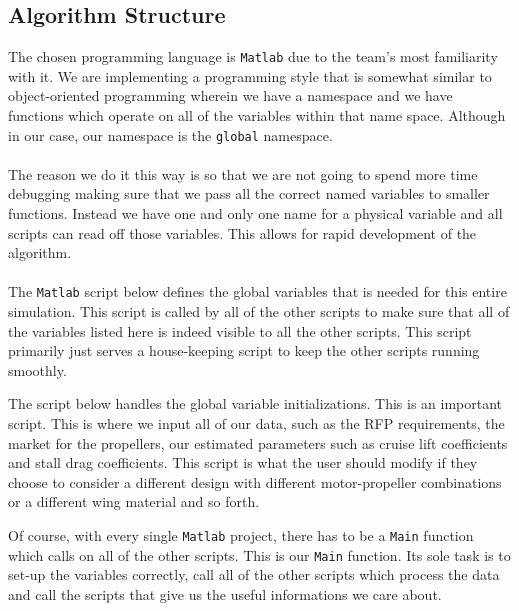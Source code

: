 \documentclass[letter, 12pt]{article}
\begin{document}
\begin{center}
\section{Algorithm Structure}
\begin{comment}
\end{comment}
The chosen programming language is \texttt{Matlab} due to the team's most familiarity with it. We are implementing a programming style that is somewhat similar to object-oriented programming wherein we have a namespace and we have functions which operate on all of the variables within that name space. Although in our case, our namespace is the \texttt{global} namespace.
\\~\\The reason we do it this way is so that we are not going to spend more time debugging making sure that we pass all the correct named variables to smaller functions. Instead we have one and only one name for a physical variable and all scripts can read off those variables. This allows for rapid development of the algorithm.
\\~\\The \texttt{Matlab} script below defines the global variables that is needed for this entire simulation. This script is called by all of the other scripts to make sure that all of the variables listed here is indeed visible to all the other scripts. This script primarily just serves a house-keeping script to keep the other scripts running smoothly.

$$$$
The script below handles the global variable initializations. This is an important script. This is where we input all of our data, such as the RFP requirements, the market for the propellers, our estimated parameters such as cruise lift coefficients and stall drag coefficients. This script is what the user should modify if they choose to consider a different design with different motor-propeller combinations or a different wing material and so forth.

$$$$
Of course, with every single \texttt{Matlab} project, there has to be a \texttt{Main} function which calls on all of the other scripts. This is our \texttt{Main} function. Its sole task is to set-up the variables correctly, call all of the other scripts which process the data and call the scripts that give us the useful informations we care about.



\end{center}
\end{document}
